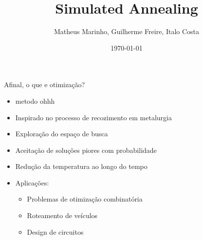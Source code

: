 \documentclass{beamer}
\title{Simulated Annealing}
\author{Matheus Marinho, Guilherme Freire, Italo Costa}
\date{\today}
\begin{document}
\frame{\titlepage}

\begin{frame}{Afinal, o que e otimização?}
    \begin{itemize}
        \item metodo ohhh
        \item Inspirado no processo de recozimento em metalurgia
        \item Exploração do espaço de busca
        \item Aceitação de soluções piores com probabilidade
        \item Redução da temperatura ao longo do tempo
        \item Aplicações:
            \begin{itemize}
                \item Problemas de otimização combinatória
                \item Roteamento de veículos
                \item Design de circuitos
            \end{itemize}
    \end{itemize}
\end{frame}
\end{document}
